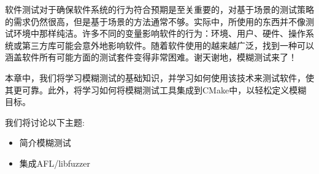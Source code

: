 软件测试对于确保软件系统的行为符合预期是至关重要的，对基于场景的测试策略的需求仍然很高，但是基于场景的方法通常不够。实际中，所使用的东西并不像测试环境中那样纯洁。许多不同的变量影响软件的行为：环境、用户、硬件、操作系统或第三方库可能会意外地影响软件。随着软件使用的越来越广泛，找到一种可以涵盖软件所有可能方面的测试套件变得非常困难。谢天谢地，模糊测试来了！

本章中，我们将学习模糊测试的基础知识，并学习如何使用该技术来测试软件，使其更可靠。此外，将学习如何将模糊测试工具集成到CMake中，以轻松定义模糊目标。

我们将讨论以下主题:

\begin{itemize}
\item 
简介模糊测试

\item 
集成AFL/libfuzzer
\end{itemize}

























